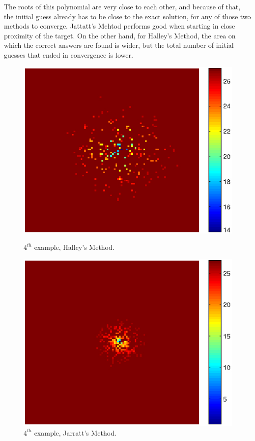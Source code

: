 \documentclass{article}
\begin{document}
The roots of this polynomial are very close to each other, and because of that, the initial guess
already has to be close to the exact solution, for any of those two methods to converge. Jattatt's
Mehtod performs good when starting in close proximity of the target. On the other hand, for Halley's
Method, the area on which the correct answers are found is wider, but the total number of initial
guesses that ended in convergence is lower.

\begin{figure}[H]
	\begin{minipage}[b]{0.48\linewidth}
		\centering
		\includegraphics[scale=0.68]{example4halley.jpg}
		\caption{$4^{th}$ example, Halley's Method.}
		\label{fig:figure7}
	\end{minipage}
	\hspace{0.5cm}
	\begin{minipage}[b]{0.48\linewidth}
		\centering
		\includegraphics[scale=0.68]{example4jarratt.jpg}
		\caption{$4^{th}$ example, Jarratt's Method.}
		\label{fig:figure8}
	\end{minipage}
\end{figure}
\end{document}
